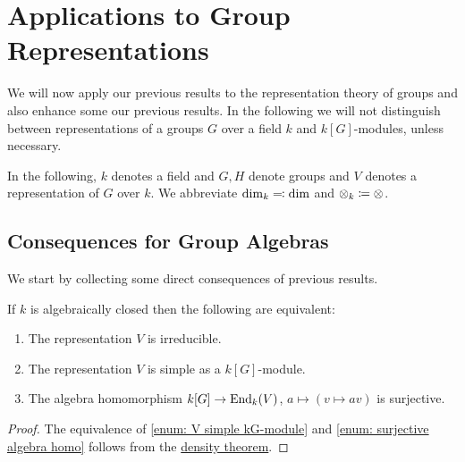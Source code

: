 \section{Applications to Group Representations}


\begin{fluff}
  We will now apply our previous results to the representation theory of groups and also enhance some our previous results.
  In the following we will not distinguish between representations of a groups $G$ over a field $k$ and $k[G]$-modules, unless necessary.
\end{fluff}


\begin{conventions}
  In the following, $k$ denotes a field and $G, H$ denote groups and $V$ denotes a representation of $G$ over $k$.
  We abbreviate $\dim_k \eqqcolon \dim$ and $\otimes_k \coloneqq \otimes$.
\end{conventions}





\subsection{Consequences for Group Algebras}


\begin{fluff}
  We start by collecting some direct consequences of previous results.
\end{fluff}


\begin{lemma}
  \label{lemma: equivalence to irreducible}
  If $k$ is algebraically closed then the following are equivalent:
  \begin{enumerate}
    \item \label{enum: V irreducible}
      The representation $V$ is irreducible.
    \item \label{enum: V simple kG-module}
      The representation $V$ is simple as a $k[G]$-module.
    \item \label{enum: surjective algebra homo}
      The algebra homomorphism $k[G] \to \operatorname{End}_k(V)$, $a \mapsto (v \mapsto av)$ is surjective.
  \end{enumerate}
\end{lemma}
\begin{proof}
  The equivalence of \ref*{enum: V simple kG-module} and \ref*{enum: surjective algebra homo} follows from the \hyperref[theorem: density theorem]{density theorem}.
\end{proof}


